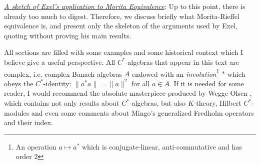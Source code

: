 \begin{itroman}
	\item \underline{\textit{A sketch of Exel's application to Morita Equivalence}}: Up to this point, there is already too much to digest. Therefore, we discuss briefly what Morita-Rieffel equivalence is, and present only the skeleton of the arguments used by Exel, quoting without proving his main results.      
\end{itroman}
\thispagestyle{empty}
All sections are filled with some examples and some historical context which I believe give a useful perspective. All $C^*$-algebras that appear in this text are complex, i.e. complex Banach algebras $A$ endowed with an \textit{involution}\footnote{An operation $a \longmapsto a^*$ which is conjugate-linear, anti-commutative and has order 2} $*$ which obeys the $C^*$-identity: $\|a^*a\|=\|a\|^2$ for all $a\in A$. If it is needed for some reader, I would recommend the absolute masterpiece produced by Wegge-Olsen \cite{wegge1993k}, which contains not only results about $C^*$-algebras, but also $K$-theory, Hilbert $C^*$-modules and even some comments about Mingo's generalized Fredholm operators and their index. 


\thispagestyle{empty}